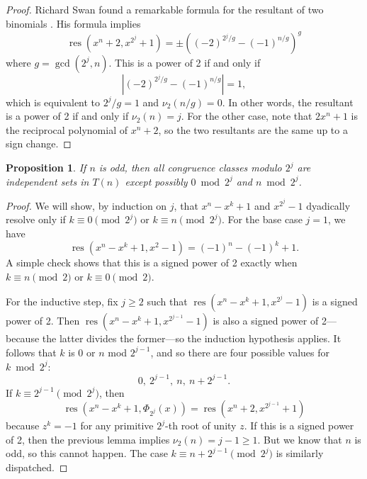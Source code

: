 \documentclass[]{article}
\newtheorem{proposition}{Proposition}[section]
\theoremstyle{definition}
\DeclareMathOperator{\res}{res}
\newcommand{\tri}[3]{\ensuremath{#1^{#2} - #1^{#3} + 1}}
\begin{document}
\begin{proof}
    Richard Swan found a remarkable formula for the resultant of two binomials
    \cite{swan}. His formula implies
    \begin{equation*}
        \res(x^n + 2, x^{2^j} + 1) = \pm((-2)^{2^j / g} - (-1)^{n/g})^g
    \end{equation*}
    where $g = \gcd(2^j, n)$. This is a power of 2 if and only if
    \begin{equation*}
        |(-2)^{2^j / g} - (-1)^{n / g}| = 1,
    \end{equation*}
    which is equivalent to $2^j / g = 1$ and $\nu_2(n / g) = 0$. In other words,
    the resultant is a power of 2 if and only if $\nu_2(n) = j$. For the other
    case, note that $2x^n + 1$ is the reciprocal polynomial of $x^n + 2$, so the
    two resultants are the same up to a sign change.
\end{proof}

\begin{proposition}
    \label{missed-classes} If $n$ is odd, then all congruence classes modulo
    $2^j$ are independent sets in $T(n)$ except possibly $0 \bmod 2^j$ and $n
    \bmod 2^j$.
\end{proposition}

\begin{proof}
    We will show, by induction on $j$, that $\tri{x}{n}{k}$ and $x^{2^j} - 1$
    dyadically resolve only if $k \equiv 0 \pmod{2^j}$ or $k \equiv n
    \pmod{2^j}$. For the base case $j = 1$, we have
    \begin{equation*}
        \res(\tri{x}{n}{k}, x^2 - 1) = (-1)^n - (-1)^k + 1.
    \end{equation*}
    A simple check shows that this is a signed power of 2 exactly when $k
    \equiv n \pmod{2}$ or $k \equiv 0 \pmod{2}$.

    For the inductive step, fix $j \geq 2$ such that $\res(\tri{x}{n}{k},
    x^{2^j} - 1)$ is a signed power of 2. Then $\res(\tri{x}{n}{k}, x^{2^{j -
    1}} - 1)$ is also a signed power of 2---because the latter divides the former---so the induction hypothesis applies. It follows that $k$ is $0$ or $n$ mod
    $2^{j - 1}$, and so there are four possible values for $k \bmod 2^j$:
    \begin{equation*}
        0,\ 2^{j - 1},\ n,\ n + 2^{j - 1}.
    \end{equation*}
    If $k \equiv 2^{j - 1} \pmod{2^j}$, then
    \begin{equation*}
        \res(\tri{x}{n}{k}, \Phi_{2^j}(x))
        = \res(x^n + 2, x^{2^{j - 1}} + 1)
    \end{equation*}
    because $z^k = -1$ for any primitive $2^j$-th root of unity $z$. If this is
    a signed power of 2, then the previous lemma implies $\nu_2(n) = j - 1 \geq
    1$. But we know that $n$ is odd, so this cannot happen. The case $k
    \equiv n + 2^{j - 1} \pmod{2^j}$ is similarly dispatched.
\end{proof}
\end{document}
